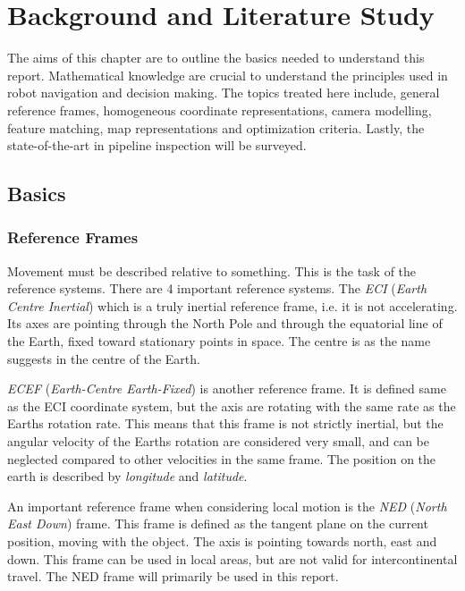 


\chapter{Background and Literature Study}
\label{chap2}
The aims of this chapter are to outline the basics needed to understand this report. Mathematical
knowledge are crucial to understand the principles used in robot navigation and decision
making. The topics treated here include, general reference frames, homogeneous coordinate
representations, camera modelling, feature matching, map representations and optimization
criteria. Lastly, the state-of-the-art in pipeline inspection will be surveyed. 



\section{Basics}

\subsection{Reference Frames}
	Movement must be described relative to something. This is the task of the reference systems. There are
	4 important reference systems. The \emph{ECI} (\emph{Earth Centre Inertial}) which is a truly inertial reference
	frame, i.e. it is not accelerating. Its axes are pointing through the North Pole and through the
	equatorial line of the Earth, fixed toward stationary points in space. The centre is as the name
	suggests in the centre of the Earth. 
	
	\emph{ECEF} (\emph{Earth-Centre Earth-Fixed}) is another reference frame. It is defined same as the ECI coordinate
	system, but the axis are rotating with the same rate as the Earths rotation rate. This means that this frame
	is not
	strictly inertial, but the angular velocity of the Earths rotation are considered very small, and can
	be neglected compared to other velocities in the same frame. The position on the earth
    is described by \emph{longitude} and \emph{latitude}.

	An important reference frame when considering local motion is the \emph{NED}
    (\emph{North East Down}) frame. This
	frame is defined as the tangent plane on the current position, moving with the object. The axis
	is pointing towards north, east and down. This frame can be used in local areas, but are
	not valid for intercontinental travel. The NED frame will primarily be used in this report. 

